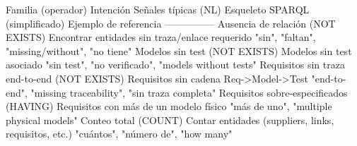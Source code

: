 {}\markdownRendererPipe{} Familia (operador) \markdownRendererPipe{} Intención \markdownRendererPipe{} Señales típicas (NL) \markdownRendererPipe{} Esqueleto SPARQL (simplificado) \markdownRendererPipe{} Ejemplo de referencia \markdownRendererPipe{} \markdownRendererPipe{}---\markdownRendererPipe{}---\markdownRendererPipe{}---\markdownRendererPipe{}---\markdownRendererPipe{}---\markdownRendererPipe{} \markdownRendererPipe{} Ausencia de relación (NOT EXISTS) \markdownRendererPipe{} Encontrar entidades sin traza/enlace requerido \markdownRendererPipe{} "sin", "faltan", "missing/without", "no tiene" \markdownRendererPipe{}  \markdownRendererPipe{}  \markdownRendererPipe{} \markdownRendererPipe{} Modelos sin test (NOT EXISTS) \markdownRendererPipe{} Modelos sin test asociado \markdownRendererPipe{} "sin test", "no verificado", "models without tests" \markdownRendererPipe{}  \markdownRendererPipe{}  \markdownRendererPipe{} \markdownRendererPipe{} Requisitos sin traza end-to-end (NOT EXISTS) \markdownRendererPipe{} Requisitos sin cadena Req->Model->Test \markdownRendererPipe{} "end-to-end", "missing traceability", "sin traza completa" \markdownRendererPipe{}  \markdownRendererPipe{}  \markdownRendererPipe{} \markdownRendererPipe{} Requisitos sobre-especificados (HAVING) \markdownRendererPipe{} Requisitos con más de un modelo físico \markdownRendererPipe{} "más de uno", "multiple physical models" \markdownRendererPipe{}  \markdownRendererPipe{}  \markdownRendererPipe{} \markdownRendererPipe{} Conteo total (COUNT) \markdownRendererPipe{} Contar entidades (suppliers, links, requisitos, etc.) \markdownRendererPipe{} "cuántos", "número de", "how many" \markdownRendererPipe{}  \markdownRendererPipe{}  \markdownRendererPipe{} 